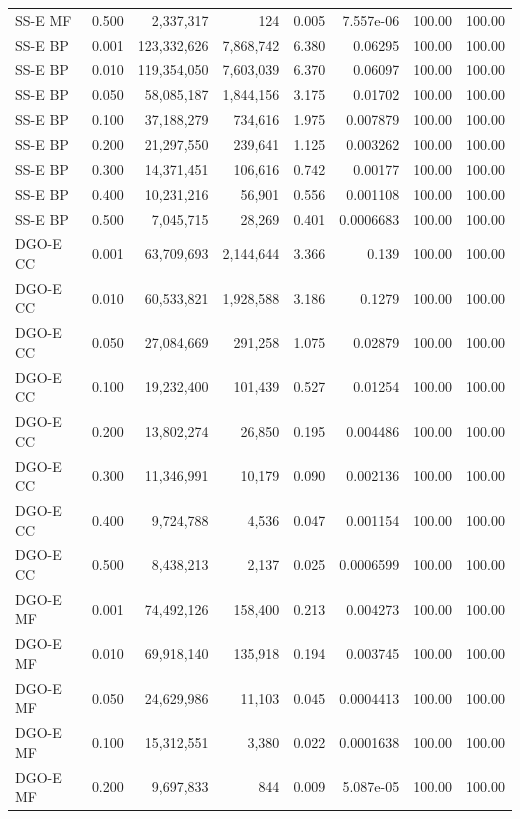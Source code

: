 \begin{longtable}{lrrrrrrr}
SS-E MF & 0.500 & 2,337,317 & 124 & 0.005 & 7.557e-06 & 100.00 & 100.00 \\
SS-E BP & 0.001 & 123,332,626 & 7,868,742 & 6.380 & 0.06295 & 100.00 & 100.00 \\
SS-E BP & 0.010 & 119,354,050 & 7,603,039 & 6.370 & 0.06097 & 100.00 & 100.00 \\
SS-E BP & 0.050 & 58,085,187 & 1,844,156 & 3.175 & 0.01702 & 100.00 & 100.00 \\
SS-E BP & 0.100 & 37,188,279 & 734,616 & 1.975 & 0.007879 & 100.00 & 100.00 \\
SS-E BP & 0.200 & 21,297,550 & 239,641 & 1.125 & 0.003262 & 100.00 & 100.00 \\
SS-E BP & 0.300 & 14,371,451 & 106,616 & 0.742 & 0.00177 & 100.00 & 100.00 \\
SS-E BP & 0.400 & 10,231,216 & 56,901 & 0.556 & 0.001108 & 100.00 & 100.00 \\
SS-E BP & 0.500 & 7,045,715 & 28,269 & 0.401 & 0.0006683 & 100.00 & 100.00 \\
DGO-E CC & 0.001 & 63,709,693 & 2,144,644 & 3.366 & 0.139 & 100.00 & 100.00 \\
DGO-E CC & 0.010 & 60,533,821 & 1,928,588 & 3.186 & 0.1279 & 100.00 & 100.00 \\
DGO-E CC & 0.050 & 27,084,669 & 291,258 & 1.075 & 0.02879 & 100.00 & 100.00 \\
DGO-E CC & 0.100 & 19,232,400 & 101,439 & 0.527 & 0.01254 & 100.00 & 100.00 \\
DGO-E CC & 0.200 & 13,802,274 & 26,850 & 0.195 & 0.004486 & 100.00 & 100.00 \\
DGO-E CC & 0.300 & 11,346,991 & 10,179 & 0.090 & 0.002136 & 100.00 & 100.00 \\
DGO-E CC & 0.400 & 9,724,788 & 4,536 & 0.047 & 0.001154 & 100.00 & 100.00 \\
DGO-E CC & 0.500 & 8,438,213 & 2,137 & 0.025 & 0.0006599 & 100.00 & 100.00 \\
DGO-E MF & 0.001 & 74,492,126 & 158,400 & 0.213 & 0.004273 & 100.00 & 100.00 \\
DGO-E MF & 0.010 & 69,918,140 & 135,918 & 0.194 & 0.003745 & 100.00 & 100.00 \\
DGO-E MF & 0.050 & 24,629,986 & 11,103 & 0.045 & 0.0004413 & 100.00 & 100.00 \\
DGO-E MF & 0.100 & 15,312,551 & 3,380 & 0.022 & 0.0001638 & 100.00 & 100.00 \\
DGO-E MF & 0.200 & 9,697,833 & 844 & 0.009 & 5.087e-05 & 100.00 & 100.00 \\

\end{longtable}
